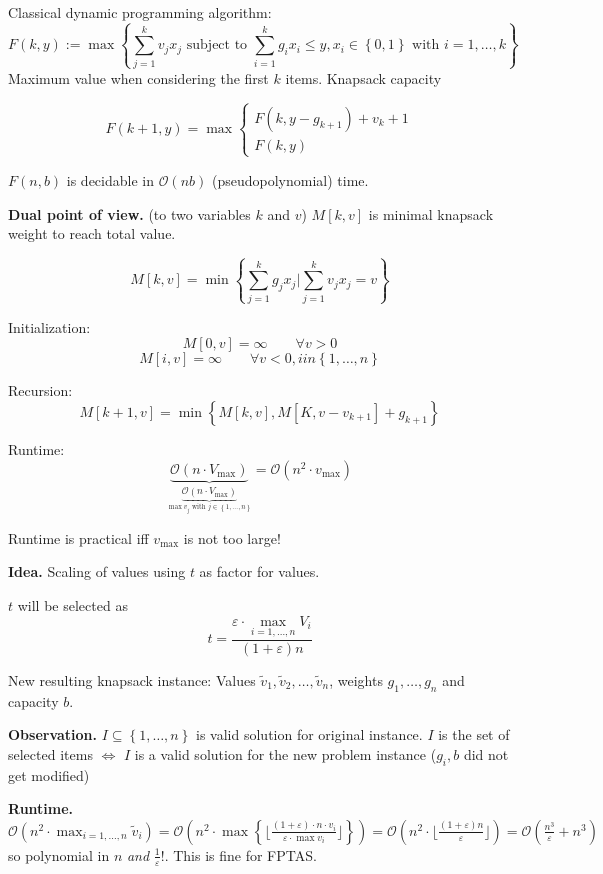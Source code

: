 \documentclass[a4paper]{article}
\newcommand{\cls}[1]{\rm{#1}}
\newcommand{\set}[1]{\left\{#1\right\}}
\begin{document}
Classical dynamic programming algorithm:
\[
  F(k, y) := \max\set{\sum_{j = 1}^k v_j x_j \text{ subject to }
    \sum_{i = 1}^k g_i x_i \leq y, x_i \in \set{0, 1} \text{ with } i = 1, \ldots, k}
\]
Maximum value when considering the first $k$ items. Knapsack capacity

\[
  F(k + 1, y) = \max\begin{cases}
    F(k, y - g_{k+1}) + v_k + 1 \\
    F(k, y)
  \end{cases}
\]

$F(n, b)$ is decidable in $\mathcal{O}(nb)$ (pseudopolynomial) time.

\textbf{Dual point of view.} (to two variables $k$ and $v$)
  $M[k, v]$ is minimal knapsack weight to reach total value.

\[
  M[k, v] = \min\set{\sum_{j=1}^k g_j x_j | \sum_{j=1}^k v_j x_j = v}
\]

Initialization:
\[
  M[0, v] = \infty \qquad \forall v > 0
\] \[
  M[i, v] = \infty \qquad \forall v < 0, i in \set{1, \ldots, n}
\]

Recursion:
\[
  M[k+1, v] = \min\set{M[k, v], M[K, v - v_{k+1}] + g_{k+1}}
\]

Runtime:
\[
  \underbrace{\mathcal{O}(n \cdot V_{\text{max}})}_{
    \underbrace{\mathcal{O}(n \cdot V_{\text{max}})}_{
      \max{v_j} \text{ with } j \in \set{1, \ldots, n}
    }
  }
    = \mathcal{O}(n^2 \cdot v_{\text{max}})
\]

Runtime is practical iff $v_{\text{max}}$ is not too large!

\textbf{Idea.}
  Scaling of values using $t$ as factor for values.

$t$ will be selected as
\[
  t = \frac{\varepsilon \cdot \operatorname{max}_{i = 1,\ldots,n} V_i}
    {(1 + \varepsilon) n}
\]

New resulting knapsack instance:
Values $\tilde v_1, \tilde v_2, \ldots, \tilde v_n$, weights
$g_1, \ldots, g_n$ and capacity $b$.

\textbf{Observation.}
  $I \subseteq \set{1, \ldots, n}$ is valid solution for original instance.
  $I$ is the set of selected items $\Leftrightarrow$ $I$ is a valid solution
  for the new problem instance ($g_i, b$ did not get modified)

\textbf{Runtime.}
  $\mathcal{O}(n^2 \cdot \max_{i=1,\ldots,n} \tilde v_i) =
  \mathcal{O}(n^2 \cdot \max\set{\lfloor \frac
    {(1 + \varepsilon) \cdot n \cdot v_i}
    {\varepsilon \cdot \max{v_i}}
  \rfloor}) = \mathcal{O}(n^2 \cdot \lfloor\frac
    {(1 + \varepsilon) n}
    {\varepsilon}
  \rfloor) = \mathcal{O}(\frac{n^3}{\varepsilon} + n^3)$
  so polynomial in $n$ \emph{and} $\frac{1}{\varepsilon}!$.
  This is fine for \cls{FPTAS}.
\end{document}
